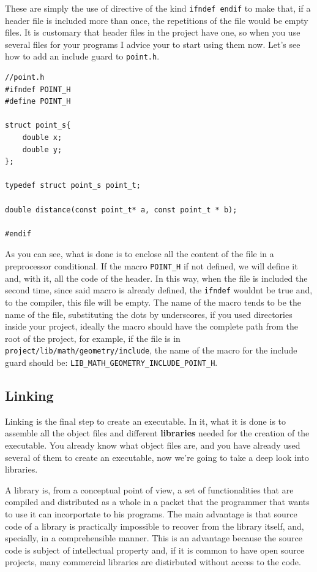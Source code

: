 \documentclass[a4paper]{article}
\begin{document}
These are simply the use of directive of the kind \verb!ifndef endif! to make
that, if a header file is included more than once, the repetitions of the file
would be empty files. It is customary that header files in the project have one,
so when you use several files for your programs I advice your to start using
them now. Let's see how to add an include guard to \verb!point.h!.

\noindent
\begin{minipage}[H]{\linewidth}
\mbox{}
\begin{lstlisting}[style=C,
caption={Example of include guard},
label={lst:includeGuard}]
//point.h
#ifndef POINT_H
#define POINT_H

struct point_s{
    double x;
    double y;
};

typedef struct point_s point_t;

double distance(const point_t* a, const point_t * b);

#endif
\end{lstlisting}
\end{minipage}

As you can see, what is done is to enclose all the content of the file in a
preprocessor conditional. If the macro \verb!POINT_H! if not defined, we will
define it and, with it, all the code of the header. In this way, when the file
is included the second time, since said macro is already defined, the
\verb!ifndef! wouldnt be true and, to the compiler, this file will be empty.
The name of the macro tends to be the name of the file, substituting the dots
by underscores, if you used directories inside your project, ideally the macro
should have the complete path from the root of the project, for example, if the
file is in \verb!project/lib/math/geometry/include!, the name of the macro for
the include guard should be: \verb!LIB_MATH_GEOMETRY_INCLUDE_POINT_H!.


\subsection{Linking}
Linking is the final step to create an executable. In it, what it is done is to
assemble all the object files and different \textbf{libraries} needed for the
creation of the executable. You already know what object files are, and you have
already used several of them to create an executable, now we're going to take a
deep look into libraries.

A library is, from a conceptual point of view, a set of functionalities that are
compiled and distributed as a whole in a packet that the programmer that wants
to use it can incorportate to his programs. The main advantage is that source
code of a library is practically impossible to recover from the library itself,
and, specially, in a comprehensible manner. This is an advantage because the
source code is subject of intellectual property and, if it is common to have
open source projects, many commercial libraries are distirbuted without access
to the code.
\end{document}
